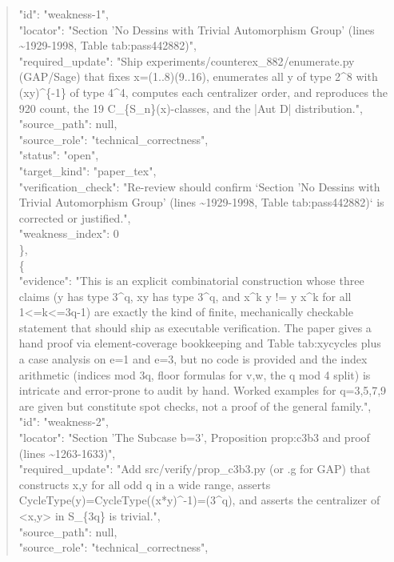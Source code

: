\documentclass[11pt]{article}
\begin{document}
\begin{quote}
      "id": "weakness-1",\\
      "locator": "Section 'No Dessins with Trivial Automorphism Group' (lines \~{}1929-1998, Table tab:pass442882)",\\
      "required\_update": "Ship experiments/counterex\_882/enumerate.py (GAP/Sage) that fixes x=(1..8)(9..16), enumerates all y of type 2\^{}8 with (xy)\^{}\{-1\} of type 4\^{}4, computes each centralizer order, and reproduces the 920 count, the 19 C\_\{S\_n\}(x)-classes, and the |Aut D| distribution.",\\
      "source\_path": null,\\
      "source\_role": "technical\_correctness",\\
      "status": "open",\\
      "target\_kind": "paper\_tex",\\
      "verification\_check": "Re-review should confirm `Section 'No Dessins with Trivial Automorphism Group' (lines \~{}1929-1998, Table tab:pass442882)` is corrected or justified.",\\
      "weakness\_index": 0\\
    \},\\
    \{\\
      "evidence": "This is an explicit combinatorial construction whose three claims (y has type 3\^{}q, xy has type 3\^{}q, and x\^{}k y != y x\^{}k for all 1<=k<=3q-1) are exactly the kind of finite, mechanically checkable statement that should ship as executable verification. The paper gives a hand proof via element-coverage bookkeeping and Table tab:xycycles plus a case analysis on e=1 and e=3, but no code is provided and the index arithmetic (indices mod 3q, floor formulas for v,w, the q mod 4 split) is intricate and error-prone to audit by hand. Worked examples for q=3,5,7,9 are given but constitute spot checks, not a proof of the general family.",\\
      "id": "weakness-2",\\
      "locator": "Section 'The Subcase b=3', Proposition prop:c3b3 and proof (lines \~{}1263-1633)",\\
      "required\_update": "Add src/verify/prop\_c3b3.py (or .g for GAP) that constructs x,y for all odd q in a wide range, asserts CycleType(y)=CycleType((x*y)\^{}-1)=(3\^{}q), and asserts the centralizer of <x,y> in S\_\{3q\} is trivial.",\\
      "source\_path": null,\\
      "source\_role": "technical\_correctness",\\

\end{quote}
\end{document}
